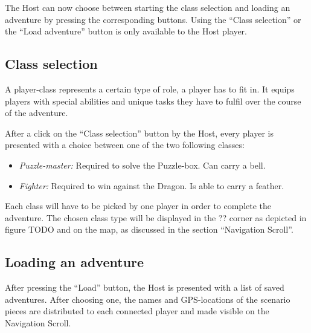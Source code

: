 \documentclass{sigchi-ext}
\begin{document}
The Host can now choose between starting the class selection and loading an adventure by pressing the corresponding buttons. Using the ``Class selection'' or the ``Load adventure'' button is only available to the Host player.

\subsection{Class selection}

A player-class represents a certain type of role, a player has to fit in. It equips players with special abilities and unique tasks they have to fulfil over the course of the adventure.

After a click on the ``Class selection'' button by the Host, every player is presented with a choice between one of the two following classes:

\begin{itemize}\compresslist%
	\item \textit{Puzzle-master:} Required to solve the Puzzle-box. Can carry a bell.
	\item \textit{Fighter:} Required to win against the Dragon. Is able to carry a feather.
\end{itemize}

Each class will have to be picked by one player in order to complete the adventure. The chosen class type will be displayed in the ?? corner as depicted in figure TODO and on the map, as discussed in the section ``Navigation Scroll''.



\subsection{Loading an adventure}

After pressing the ``Load'' button, the Host is presented with a list of saved adventures. After choosing one, the names and GPS-locations of the scenario pieces are distributed to each connected player and made visible on the Navigation Scroll.
\end{document}
